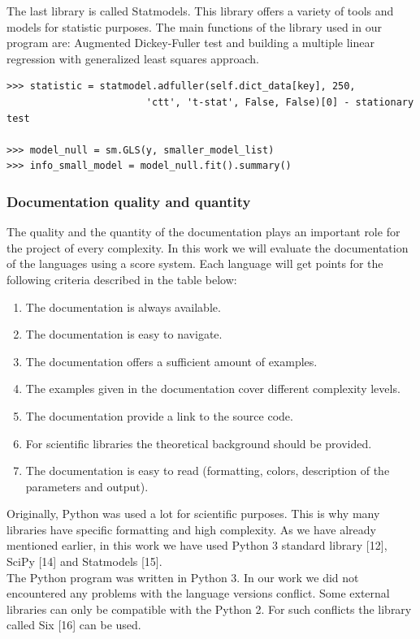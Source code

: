 \documentclass[
  twoside,
  12pt, a4paper,
  footinclude=true,
  headinclude=true,
  cleardoublepage=empty
]{article}
\begin{document}
The last library is called Statmodels. This library offers a variety of tools and models for statistic purposes. The main functions of the library used in our program are: Augmented Dickey-Fuller test and building a multiple linear regression with generalized least squares approach.
\begin{verbatim}
>>> statistic = statmodel.adfuller(self.dict_data[key], 250, 
                        'ctt', 't-stat', False, False)[0] - stationary test
                        
>>> model_null = sm.GLS(y, smaller_model_list)
>>> info_small_model = model_null.fit().summary()
\end{verbatim}   

\subsubsection{Documentation quality and quantity}
The quality and the quantity of the documentation plays an important role for the project of every complexity. In this work we will evaluate the documentation of the languages using a score system. Each language will get points for the following criteria described in the table below:
\begin{enumerate}
    \item The documentation is always available.
    \item The documentation is easy to navigate.
    \item The documentation offers a sufficient amount of examples.
    \item The examples given in the documentation cover different complexity levels.
    \item The documentation provide a link to the source code.
    \item For scientific libraries the theoretical background should be provided.
    \item The documentation is easy to read (formatting, colors, description of the parameters and output).
\end{enumerate}
Originally, Python was used a lot for scientific purposes. This is why many libraries have specific formatting and high complexity. As we have already mentioned earlier, in this work we have used Python 3 standard library [12],  SciPy [14] and Statmodels [15].\\
The Python program was written in Python 3. In our work we did not encountered any problems with the language versions conflict. Some external libraries can only be compatible with the Python 2. For such conflicts the library called Six [16] can be used.\\
\end{document}
